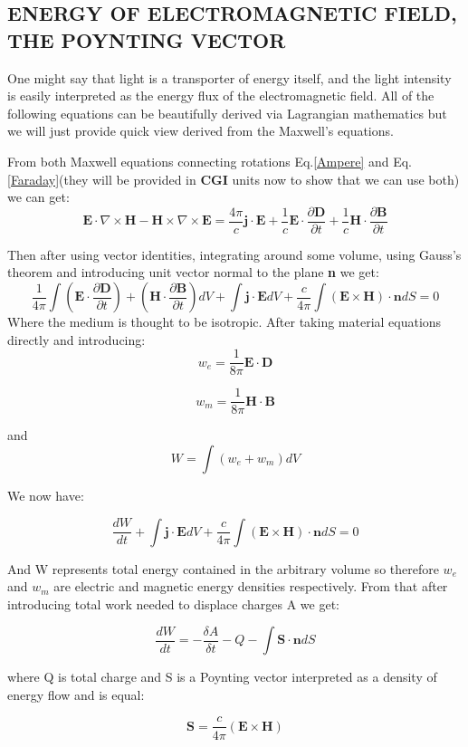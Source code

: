 \subsection{ENERGY OF ELECTROMAGNETIC FIELD, THE POYNTING VECTOR}

One might say that light is a transporter of energy itself, and the light intensity is easily interpreted as the energy flux of the electromagnetic field. All of the following equations can be beautifully derived via Lagrangian mathematics but we will just provide quick view derived from the Maxwell's equations. 

From both Maxwell equations connecting rotations Eq.\ref{Ampere} and Eq.\ref{Faraday}(they will be provided in \textbf{CGI} units now to show that we can use both) we can get:
\begin{equation}
\mathbf{E}\cdot \nabla \times \mathbf{H} - \mathbf{H} \times \nabla \times \mathbf{E} = \frac{4\pi}{c}\mathbf{j}\cdot \mathbf{E} + \frac{1}{c}\mathbf{E} \cdot \frac{\partial \mathbf{D}}{\partial t} + \frac{1}{c} \mathbf{H} \cdot \frac{\partial \mathbf{B}}{\partial t}
\end{equation}

Then after using vector identities, integrating around some volume, using Gauss's theorem and introducing unit vector normal to the plane \textbf{n} we get:
$$
\frac{1}{4\pi} \int (\mathbf{E} \cdot  \frac{\partial \mathbf{D}}{\partial t}) + (\mathbf{H} \cdot \frac{\partial \mathbf{B}}{\partial t})dV + \int \mathbf{j} \cdot \mathbf{E} dV + \frac{c}{4\pi }\int  (\mathbf{E}\times \mathbf{H}) \cdot \mathbf{n} dS = 0
$$
Where the medium is thought to be isotropic. After taking material equations directly and introducing:
\begin{equation}
w_e = \frac{1}{8\pi}\mathbf{E} \cdot \mathbf{D}
\end{equation}

\begin{equation}
w_m = \frac{1}{8\pi}\mathbf{H} \cdot \mathbf{B}
\end{equation}

and 
\begin{equation}
W = \int (w_e + w_m) dV
\end{equation}

We now have:



$$
\frac{dW}{dt} + \int \mathbf{j} \cdot \mathbf{E}dV + \frac{c}{4\pi } \int  ( \mathbf{E} \times \mathbf{H} )  \cdot \mathbf{n} dS = 0
$$


And W represents total energy contained in the arbitrary volume so therefore $w_e$ and $w_m$ are electric and magnetic energy densities respectively. From that after introducing total work needed to displace charges A we get:

$$
\frac{dW}{dt} = -\frac{\delta A}{\delta t} - Q - \int \mathbf{S} \cdot \mathbf{n} dS
$$

where Q is total charge and S is a Poynting vector interpreted as a density of energy flow and is equal:

\begin{equation}
\mathbf{S} = \frac{c}{4\pi}(\mathbf{E} \times \mathbf{H})
\end{equation}

